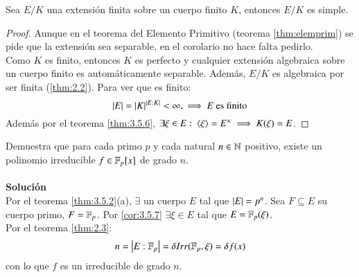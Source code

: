 \begin{cor}\label{cor:3.5.7}
    Sea $E/K$ una extensión finita sobre un cuerpo finito $K$, entonces $E/K$ es simple.
\end{cor}
\begin{proof}
    Aunque en el teorema del Elemento Primitivo (teorema \ref{thm:elemprim}) se pide que la extensión sea separable, en el corolario no hace falta pedirlo.\\
    Como $K$ es finito, entonces $K$ es perfecto y cualquier extensión algebraica sobre un cuerpo finito es automáticamente separable. Además, $E/K$ es algebraica por ser finita (\ref{thm:2.2}). Para ver que es finito:
    $$
        \left|E\right| = \left|K\right|^{\left|E:K\right|} < \infty, \implies E \text{ es finito}
    $$
    Además por el teorema \ref{thm:3.5.6}, $\exists \xi \in E:\ \langle\xi\rangle = E^\times \implies K(\xi) = E$.
\end{proof}

\begin{ex}[H3.19]
    Demuestra que para cada primo $p$ y cada natural $n \in \mathbb{N}$ positivo, existe un polinomio irreducible $f \in \mathbb{F}_p[x]$ de grado $n$.\\\\
    \textbf{Solución}\\
    Por el teorema \ref{thm:3.5.2}(a), $\exists$ un cuerpo $E$ tal que $\left|E\right| = p^n$.
    Sea $F \subseteq E$ su cuerpo primo, $F = \mathbb{F}_p$. Por \ref{cor:3.5.7} $\exists \xi \in E$ tal que $E = \mathbb{F}_p(\xi)$.\\
    Por el teorema \ref{thm:2.3}:
    $$
        n = \left|E:\mathbb{F}_p\right| = \delta Irr(\mathbb{F}_p, \xi) = \delta f(x)
    $$
    con lo que $f$ es un irreducible de grado $n$.
\end{ex}
